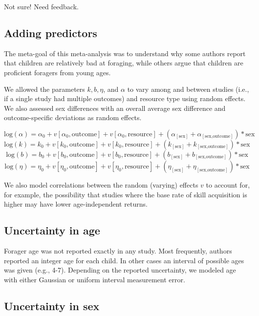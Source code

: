 \documentclass[
]{article}
\begin{document}
Not sure! Need feedback.

\hypertarget{adding-predictors}{%
\subsection{Adding predictors}\label{adding-predictors}}

The meta-goal of this meta-analysis was to understand why some authors
report that children are relatively bad at foraging, while others argue
that children are proficient foragers from young ages.

We allowed the parameters \(k, b, \eta\), and \(\alpha\) to vary among
and between studies (i.e., if a single study had multiple outcomes) and
resource type using random effects. We also assessed sex differences
with an overall average sex difference and outcome-specific deviations
as random effects.

\[ \textrm{log}(\alpha) = \alpha_0 + v[\alpha_0,\textrm{outcome}] + v[\alpha_0,\textrm{resource}] + (\alpha_{[\textrm{sex}]} + \alpha_{[\textrm{sex,outcome}]})*\textrm{sex} \]
\[ \textrm{log}(k) = k_0 + v[k_0,\textrm{outcome}] + v[k_0,\textrm{resource}] + (k_{[\textrm{sex}]} + k_{[\textrm{sex,outcome}]})*\textrm{sex} \]
\[ \textrm{log}(b) = b_0 + v[b_0,\textrm{outcome}] + v[b_0,\textrm{resource}] + (b_{[\textrm{sex}]} + b_{[\textrm{sex,outcome}]})*\textrm{sex} \]
\[ \textrm{log}(\eta) = \eta_0 + v[\eta_0,\textrm{outcome}] + v[\eta_0,\textrm{resource}] + (\eta_{[\textrm{sex}]} + \eta_{[\textrm{sex,outcome}]})*\textrm{sex} \]

We also model correlations between the random (varying) effects \(v\) to
account for, for example, the possibility that studies where the base
rate of skill acquisition is higher may have lower age-independent
returns.

\hypertarget{uncertainty-in-age}{%
\subsection{Uncertainty in age}\label{uncertainty-in-age}}

Forager age was not reported exactly in any study. Most frequently,
authors reported an integer age for each child. In other cases an
interval of possible ages was given (e.g., 4-7). Depending on the
reported uncertainty, we modeled age with either Gaussian or uniform
interval measurement error.

\hypertarget{uncertainty-in-sex}{%
\subsection{Uncertainty in sex}\label{uncertainty-in-sex}}
\end{document}
